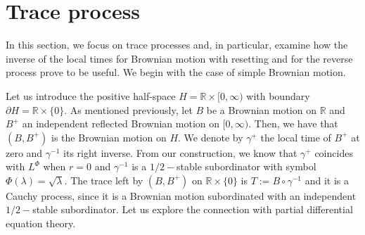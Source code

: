 \documentclass[11pt,a4paper]{article}
\theoremstyle{definition}
\theoremstyle{remark}
\begin{document}
\section{Trace process}
\label{sec:trace}
In this section, we focus on trace processes and, in particular, examine how the inverse of the local times for Brownian motion with resetting and for the reverse process prove to be useful. We begin with the case of simple Brownian motion.

Let us introduce the positive half-space $H=\mathbb{R}\times [0,\infty)$ with boundary $\partial H = \mathbb{R} \times \{0\}$. As mentioned previously, let $B$ be a Brownian motion on $\mathbb{R}$ and $B^+$ an independent reflected Brownian motion on $[0,\infty)$. Then, we have that $(B, B^+)$ is the Brownian motion on $H$. We denote by $\gamma^+$ the local time of $B^+$ at zero and $\gamma^{-1}$ its right inverse. From our construction, we know that $\gamma^+$ coincides with $L^\Phi$ when $r=0$ and $\gamma^{-1}$ is a $1/2-$stable subordinator with symbol $\Phi(\lambda)=\sqrt{\lambda}$. The trace left by $(B, B^+)$ on $\mathbb{R} \times \{0\}$ is $T:=B \circ \gamma^{-1}$ and it is a Cauchy process, since it is a Brownian motion subordinated with an independent $1/2-$stable subordinator. Let us explore the connection with partial differential equation theory.
\end{document}
